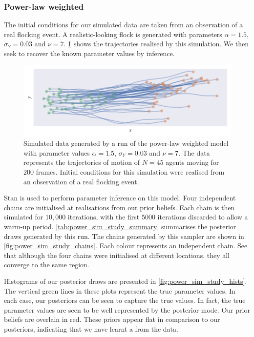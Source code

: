 \subsubsection{Power-law weighted}

The initial conditions for our simulated data are taken from an observation of a real
flocking event. A realistic-looking flock is generated with parameters $\alpha=1.5$,
$\sigma_Y=0.03$ and $\nu=7$.  \cref{fig:power_sim_study} shows the trajectories realised
by this simulation. We then seek to recover the known parameter values by inference.
\begin{figure}[tbp]
  \includegraphics{power_sim.pdf}
  \caption{Simulated data generated by a run of the power-law weighted model with
    parameter values $\alpha=1.5$, $\sigma_Y=0.03$ and $\nu=7$. The data represents the
    trajectories of motion of $N=45$ agents moving for $200$ frames. Initial conditions
    for this simulation were realised from an observation of a real flocking event.}
  \label{fig:power_sim_study}
\end{figure}

Stan is used to perform parameter inference on this model. Four independent chains are
initialised at realisations from our prior beliefs. Each chain is then simulated for
$10,000$ iterations, with the first $5000$ iterations discarded to allow a warm-up period.
\cref{tab:power_sim_study_summary} summarises the posterior draws generated by this run.
The chains generated by this sampler are shown in \cref{fig:power_sim_study_chains}. Each
colour represents an independent chain. See that although the four chains were initialised
at different locations, they all converge to the same region.

Histograms of our posterior draws are presented in \cref{fig:power_sim_study_hists}. The
vertical green lines in these plots represent the true parameter values. In each case, our
posteriors can be seen to capture the true values. In fact, the true parameter values are
seen to be well represented by the posterior mode. Our prior beliefs are overlain in red.
These priors appear flat in comparison to our posteriors, indicating that we have learnt a
from the data.

